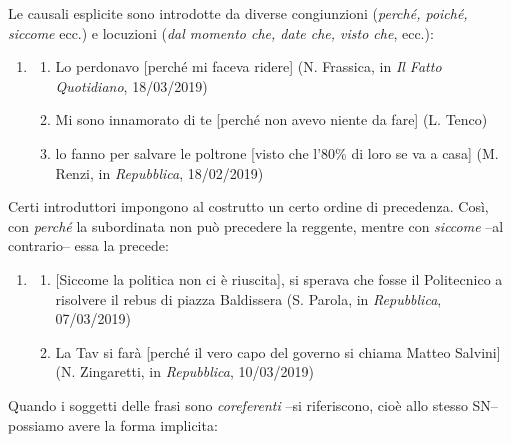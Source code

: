 \documentclass[
  a4paper,
  twoside,
  11pt,
  chapterprefix=false,
  bibliography=totocnumbered,
  listof=flat]{scrbook}
\providecommand{\tightlist}{%
  \setlength{\itemsep}{0pt}\setlength{\parskip}{0pt}}
\begin{document}
Le causali esplicite sono introdotte da diverse congiunzioni (\emph{perché, poiché, siccome} ecc.) e locuzioni (\emph{dal momento che, date che, visto che}, ecc.):

\begin{enumerate}
\def\labelenumi{(\arabic{enumi})}
\setcounter{enumi}{72}
\item
  \begin{enumerate}
  \def\labelenumii{\alph{enumii}.}
  \tightlist
  \item
    Lo perdonavo {[}perché mi faceva ridere{]} (N. Frassica, in \emph{Il Fatto Quotidiano}, 18/03/2019)
  \item
    Mi sono innamorato di te {[}perché non avevo niente da fare{]} (L. Tenco)
  \item
    lo fanno per salvare le poltrone {[}visto che l'80\% di loro se va a casa{]} (M. Renzi, in \emph{Repubblica}, 18/02/2019)
  \end{enumerate}
\end{enumerate}

Certi introduttori impongono al costrutto un certo ordine di precedenza. Così, con \emph{perché} la subordinata non può precedere la reggente, mentre con \emph{siccome} --al contrario-- essa la precede:

\begin{enumerate}
\def\labelenumi{(\arabic{enumi})}
\setcounter{enumi}{73}
\item
  \begin{enumerate}
  \def\labelenumii{\alph{enumii}.}
  \tightlist
  \item
    {[}Siccome la politica non ci è riuscita{]}, si sperava che fosse il Politecnico a risolvere il rebus di piazza Baldissera (S. Parola, in \emph{Repubblica}, 07/03/2019)
  \item
    La Tav si farà {[}perché il vero capo del governo si chiama Matteo Salvini{]} (N. Zingaretti, in \emph{Repubblica}, 10/03/2019)
  \end{enumerate}
\end{enumerate}

Quando i soggetti delle frasi sono \emph{coreferenti} --si riferiscono, cioè allo stesso SN-- possiamo avere la forma implicita:
\end{document}
